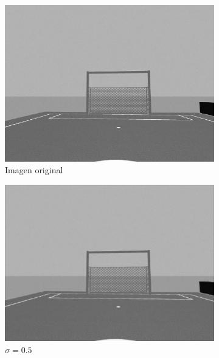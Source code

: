 \begin{figure}[H]
	\centering
	\begin{subfigure}[b]{0.41\linewidth}
		\includegraphics[width=\linewidth]{images/original.jpg}
		\caption{Imagen original}
	\end{subfigure}
	\begin{subfigure}[b]{0.41\linewidth}
		\includegraphics[width=\linewidth]{images/0.5-3.jpg}
		\caption{$\sigma=0.5$}
	\end{subfigure}
	\begin{subfigure}[b]{0.41\linewidth}

\end{subfigure}
\end{figure}
